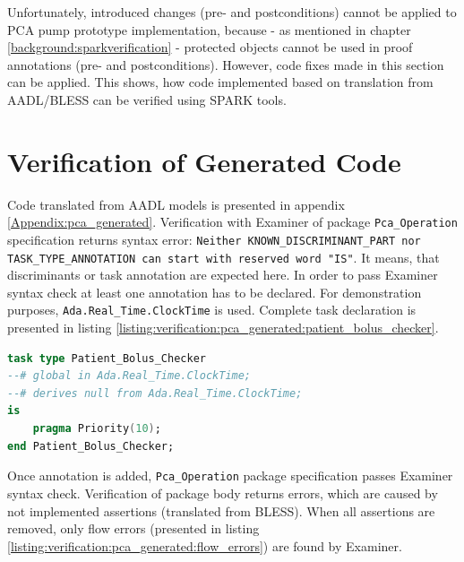 Unfortunately, introduced changes (pre- and postconditions) cannot be applied to PCA pump prototype implementation, because - as mentioned in chapter \ref{background:sparkverification} - protected objects cannot be used in proof annotations (pre- and postconditions). However, code fixes made in this section can be applied. This shows, how code implemented based on translation from AADL/BLESS can be verified using SPARK tools.



\section{Verification of Generated Code}
\label{verification:generated}

Code translated from AADL models is presented in appendix \ref{Appendix:pca_generated}. Verification with Examiner of package \lstinline{Pca_Operation} specification returns syntax error: \lstinline{Neither KNOWN_DISCRIMINANT_PART nor TASK_TYPE_ANNOTATION can start with reserved word "IS"}. It means, that discriminants or task annotation are expected here. In order to pass Examiner syntax check at least one annotation has to be declared. For demonstration purposes, \lstinline{Ada.Real_Time.ClockTime} is used. Complete task declaration is presented in listing \ref{listing:verification:pca_generated:patient_bolus_checker}.

\singlespacing
\begin{lstlisting}[language=ada, frame=single, gobble=0, caption={Undischarged Verification Condition from sum.siv file}, label={listing:verification:pca_generated:patient_bolus_checker}]
task type Patient_Bolus_Checker
--# global in Ada.Real_Time.ClockTime;
--# derives null from Ada.Real_Time.ClockTime;
is
    pragma Priority(10);
end Patient_Bolus_Checker;
\end{lstlisting}
\doublespacing

Once annotation is added, \lstinline{Pca_Operation} package specification passes Examiner syntax check. Verification of package body returns errors, which are caused by not implemented assertions (translated from BLESS). When all assertions are removed, only flow errors (presented in listing \ref{listing:verification:pca_generated:flow_errors}) are found by Examiner. 

